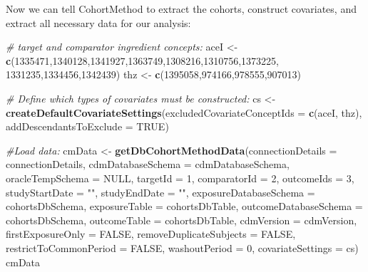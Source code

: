 \documentclass[11pt]{book}
\newenvironment{Shaded}{\begin{snugshade}}{\end{snugshade}}
\newcommand{\KeywordTok}[1]{\textcolor[rgb]{0.13,0.29,0.53}{\textbf{#1}}}
\newcommand{\DataTypeTok}[1]{\textcolor[rgb]{0.13,0.29,0.53}{#1}}
\newcommand{\DecValTok}[1]{\textcolor[rgb]{0.00,0.00,0.81}{#1}}
\newcommand{\StringTok}[1]{\textcolor[rgb]{0.31,0.60,0.02}{#1}}
\newcommand{\CommentTok}[1]{\textcolor[rgb]{0.56,0.35,0.01}{\textit{#1}}}
\newcommand{\OtherTok}[1]{\textcolor[rgb]{0.56,0.35,0.01}{#1}}
\newcommand{\NormalTok}[1]{#1}
\begin{document}
Now we can tell CohortMethod to extract the cohorts, construct
covariates, and extract all necessary data for our analysis:

\begin{Shaded}
\begin{Highlighting}[]
\CommentTok{# target and comparator ingredient concepts:}
\NormalTok{aceI <-}\StringTok{ }\KeywordTok{c}\NormalTok{(}\DecValTok{1335471}\NormalTok{,}\DecValTok{1340128}\NormalTok{,}\DecValTok{1341927}\NormalTok{,}\DecValTok{1363749}\NormalTok{,}\DecValTok{1308216}\NormalTok{,}\DecValTok{1310756}\NormalTok{,}\DecValTok{1373225}\NormalTok{,}
          \DecValTok{1331235}\NormalTok{,}\DecValTok{1334456}\NormalTok{,}\DecValTok{1342439}\NormalTok{)}
\NormalTok{thz <-}\StringTok{ }\KeywordTok{c}\NormalTok{(}\DecValTok{1395058}\NormalTok{,}\DecValTok{974166}\NormalTok{,}\DecValTok{978555}\NormalTok{,}\DecValTok{907013}\NormalTok{)}

\CommentTok{# Define which types of covariates must be constructed:}
\NormalTok{cs <-}\StringTok{ }\KeywordTok{createDefaultCovariateSettings}\NormalTok{(}\DataTypeTok{excludedCovariateConceptIds =} \KeywordTok{c}\NormalTok{(aceI, }
\NormalTok{                                                                     thz),}
                                     \DataTypeTok{addDescendantsToExclude =} \OtherTok{TRUE}\NormalTok{)}

\CommentTok{#Load data:}
\NormalTok{cmData <-}\StringTok{ }\KeywordTok{getDbCohortMethodData}\NormalTok{(}\DataTypeTok{connectionDetails =}\NormalTok{ connectionDetails,}
                                \DataTypeTok{cdmDatabaseSchema =}\NormalTok{ cdmDatabaseSchema,}
                                \DataTypeTok{oracleTempSchema =} \OtherTok{NULL}\NormalTok{,}
                                \DataTypeTok{targetId =} \DecValTok{1}\NormalTok{,}
                                \DataTypeTok{comparatorId =} \DecValTok{2}\NormalTok{,}
                                \DataTypeTok{outcomeIds =} \DecValTok{3}\NormalTok{,}
                                \DataTypeTok{studyStartDate =} \StringTok{""}\NormalTok{,}
                                \DataTypeTok{studyEndDate =} \StringTok{""}\NormalTok{,}
                                \DataTypeTok{exposureDatabaseSchema =}\NormalTok{ cohortsDbSchema,}
                                \DataTypeTok{exposureTable =}\NormalTok{ cohortsDbTable,}
                                \DataTypeTok{outcomeDatabaseSchema =}\NormalTok{ cohortsDbSchema,}
                                \DataTypeTok{outcomeTable =}\NormalTok{ cohortsDbTable,}
                                \DataTypeTok{cdmVersion =}\NormalTok{ cdmVersion,}
                                \DataTypeTok{firstExposureOnly =} \OtherTok{FALSE}\NormalTok{,}
                                \DataTypeTok{removeDuplicateSubjects =} \OtherTok{FALSE}\NormalTok{,}
                                \DataTypeTok{restrictToCommonPeriod =} \OtherTok{FALSE}\NormalTok{,}
                                \DataTypeTok{washoutPeriod =} \DecValTok{0}\NormalTok{,}
                                \DataTypeTok{covariateSettings =}\NormalTok{ cs)}
\NormalTok{cmData}
\end{Highlighting}
\end{Shaded}
\end{document}
